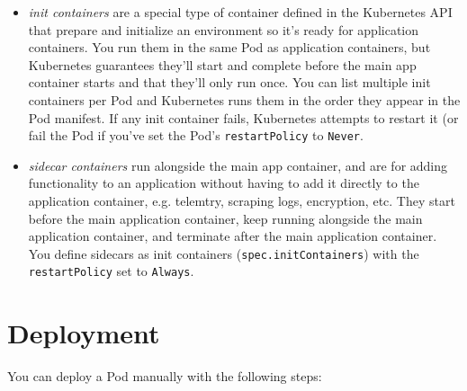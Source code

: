 \documentclass[8pt, table, xcdraw]{article}%
\begin{document}
\begin{itemize}
	\item \emph{init containers} are a special type of container defined in the Kubernetes API that prepare and initialize an environment so it’s ready for application containers. You run them in the same Pod as application containers, but Kubernetes guarantees they’ll start and complete before the main app container starts and that they’ll only run once. You can list multiple init containers per Pod and Kubernetes runs them in the order they appear in the Pod manifest. If any init container fails, Kubernetes attempts to restart it (or fail the Pod if you’ve set the Pod’s \lstinline{restartPolicy} to \lstinline{Never}.
	\item \emph{sidecar containers} run alongside the main app container, and are for adding functionality to an application without having to add it directly to the application container, e.g. telemtry, scraping logs, encryption, etc. They start before the main application container, keep running alongside the main application container, and terminate after the main application container. You define sidecars as init containers (\lstinline{spec.initContainers}) with the \lstinline{restartPolicy} set to \lstinline{Always}. 
\end{itemize}

\section{Deployment}

You can deploy a Pod manually with the following steps:
\end{document}
